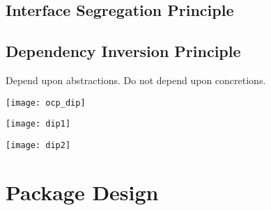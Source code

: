 \documentclass[xcolor=svgnames, handout]{beamer}
\begin{document}

\subsection{Interface Segregation Principle}


\begin{frame}{\subsecname}
\end{frame}


\subsection{Dependency Inversion Principle}


\begin{frame}{\subsecname}
    Depend upon abstractions.  \pause Do not depend upon concretions.
\end{frame}


\begin{frame}{\subsecname}
    \centering
    \texttt{[image: ocp\_dip]}
\end{frame}


\begin{frame}{\subsecname}
    \centering
    \texttt{[image: dip1]}
\end{frame}


\begin{frame}{\subsecname}
    \centering
    \texttt{[image: dip2]}
\end{frame}


\section{Package Design}
\end{document}
